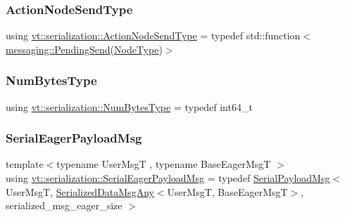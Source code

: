 \subsubsection{\texorpdfstring{Action\+Node\+Send\+Type}{ActionNodeSendType}}
{\footnotesize\ttfamily using \hyperlink{namespacevt_1_1serialization_ad4f189ca4817d31b73436c92bca55deb}{vt\+::serialization\+::\+Action\+Node\+Send\+Type} = typedef std\+::function$<$\hyperlink{structvt_1_1messaging_1_1_pending_send}{messaging\+::\+Pending\+Send}(\hyperlink{namespacevt_a866da9d0efc19c0a1ce79e9e492f47e2}{Node\+Type})$>$}

\mbox{\label{namespacevt_1_1serialization_aaa03b9b407ed5776043c163629312e40}} 
\subsubsection{\texorpdfstring{Num\+Bytes\+Type}{NumBytesType}}
{\footnotesize\ttfamily using \hyperlink{namespacevt_1_1serialization_aaa03b9b407ed5776043c163629312e40}{vt\+::serialization\+::\+Num\+Bytes\+Type} = typedef int64\+\_\+t}

\mbox{\label{namespacevt_1_1serialization_af3a0dfd4a0d3fa09c75edba0dc1b7fec}} 
\subsubsection{\texorpdfstring{Serial\+Eager\+Payload\+Msg}{SerialEagerPayloadMsg}}
{\footnotesize\ttfamily template$<$typename User\+MsgT , typename Base\+Eager\+MsgT $>$ \\
using \hyperlink{namespacevt_1_1serialization_af3a0dfd4a0d3fa09c75edba0dc1b7fec}{vt\+::serialization\+::\+Serial\+Eager\+Payload\+Msg} = typedef \hyperlink{structvt_1_1serialization_1_1_serial_payload_msg}{Serial\+Payload\+Msg}$<$ User\+MsgT, \hyperlink{structvt_1_1serialization_1_1_serialized_data_msg_any}{Serialized\+Data\+Msg\+Any}$<$User\+MsgT, Base\+Eager\+MsgT$>$, serialized\+\_\+msg\+\_\+eager\+\_\+size $>$}

\mbox{\label{namespacevt_1_1serialization_a56d2aee859dc963c2b5fad82649dd79a}} 
